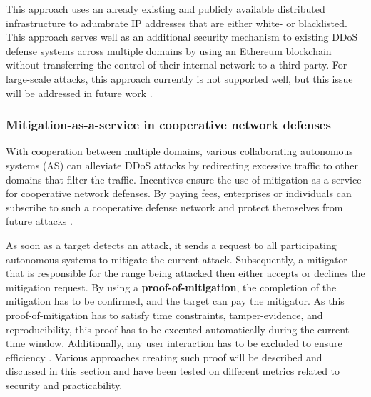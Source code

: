 This approach uses an already existing and publicly available distributed infrastructure to adumbrate IP addresses that are either white- or blacklisted. This approach serves well as an additional security mechanism to existing DDoS defense systems across multiple domains by using an Ethereum blockchain without transferring the control of their internal network to a third party. For large-scale attacks, this approach currently is not supported well, but this issue will be addressed in future work \cite{Rodrigues2017}.


\subsubsection{Mitigation-as-a-service in cooperative network defenses}

With cooperation between multiple domains, various collaborating autonomous systems (AS) can alleviate DDoS attacks by redirecting excessive traffic to other domains that filter the traffic. Incentives ensure the use of mitigation-as-a-service for cooperative network defenses. By paying fees, enterprises or individuals can subscribe to such a cooperative defense network and protect themselves from future attacks \cite{Mannhart2018}.

As soon as a target detects an attack, it sends a request to all participating autonomous systems to mitigate the current attack. Subsequently, a mitigator that is responsible for the range being attacked then either accepts or declines the mitigation request. By using a \textbf{proof-of-mitigation}, the completion of the mitigation has to be confirmed, and the target can pay the mitigator. As this proof-of-mitigation has to satisfy time constraints, tamper-evidence, and reproducibility, this proof has to be executed automatically during the current time window. Additionally, any user interaction has to be excluded to ensure efficiency \cite{Mannhart2018}. Various approaches creating such proof will be described and discussed in this section and have been tested on different metrics related to security and practicability.

